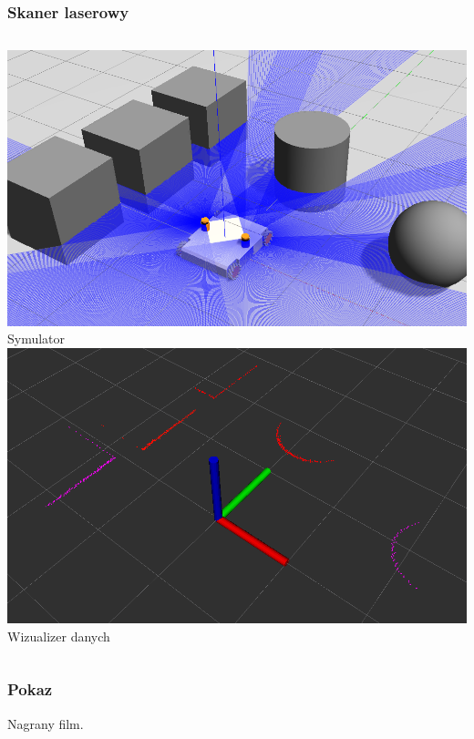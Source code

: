 \documentclass{beamer}
\begin{document}
	\begin{frame}
		\frametitle{Skaner laserowy}
		\centering
		\begin{columns}[c]
			\centering
			\includegraphics[width=\textwidth]{graphics/screen_laser.png} \\
			Symulator
			\centering
			\includegraphics[width=\textwidth]{graphics/screen_rviz.png} \\
			Wizualizer danych
		\end{columns}
	\end{frame}

	
	\begin{frame}
		\frametitle{Pokaz}
		Nagrany film.
	\end{frame}
 
 
 
\end{document}
